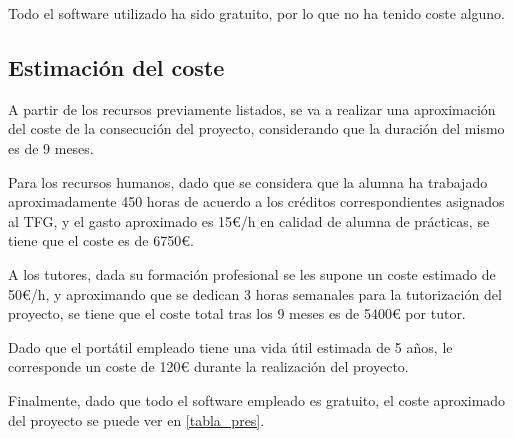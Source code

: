 Todo el software utilizado ha sido gratuito, por lo que no ha tenido coste alguno.

\subsection{Estimación del coste}

A partir de los recursos previamente listados, se va a realizar una aproximación del coste de la consecución del proyecto, considerando que la duración del mismo es de 9 meses.

Para los recursos humanos, dado que se considera que la alumna ha trabajado aproximadamente 450 horas de acuerdo a los créditos correspondientes asignados al TFG, y el gasto aproximado es 15€/h en calidad de alumna de prácticas, se tiene que el coste es de 6750€.

A los tutores, dada su formación profesional se les supone un coste estimado de 50€/h, y aproximando que se dedican 3 horas semanales para la tutorización del proyecto, se tiene que el coste total tras los 9 meses es de 5400€ por tutor.

Dado que el portátil empleado tiene una vida útil estimada de 5 años, le corresponde un coste de 120€ durante la realización del proyecto.

Finalmente, dado que todo el software empleado es gratuito, el coste aproximado del proyecto se puede ver en \eqref{tabla_pres}.

